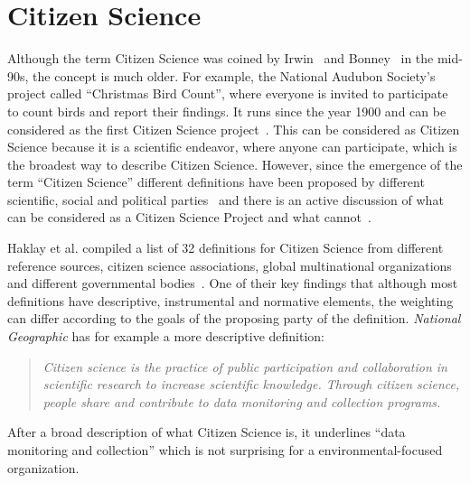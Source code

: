 \section{Citizen Science}
\label{sec:citizen_science_background}
Although the term Citizen Science was coined by Irwin~\cite{irwin1995citizen} and Bonney~\cite{bonney1996citizen} in the mid-90s, the concept is much older.
For example, the National Audubon Society's project called ``Christmas Bird Count'', where everyone is invited to participate to count birds and report their findings.
It runs since the year 1900 and can be considered as the first Citizen Science project~\cite{silvertown2009new}.
This can be considered as Citizen Science because it is a scientific endeavor, where anyone can participate, which is the broadest way to describe Citizen Science.
However, since the emergence of the term ``Citizen Science'' different definitions have been proposed by different scientific, social and political parties~\cite{heigl2019toward,ecsa2015ten,us2016crowdsourcing} and there is an active discussion of what can be considered as a Citizen Science Project and what cannot~\cite{haklay2021citizen}. 

Haklay et al. compiled a list of 32 definitions for Citizen Science from different reference sources, citizen science associations, global multinational organizations and different governmental bodies~\cite{haklay2021citizen}.
One of their key findings that although most definitions have descriptive, instrumental and normative elements, the weighting can differ according to the goals of the proposing party of the definition.
\textit{National Geographic} has for example a more descriptive definition:
\begin{quote}
\textit{Citizen science is the practice of public participation and collaboration in scientific research to increase scientific knowledge. Through citizen science, people share and contribute to data monitoring and collection programs.}
\end{quote}
After a broad description of what Citizen Science is, it underlines ``data monitoring and collection'' which is not surprising for a environmental-focused organization.

